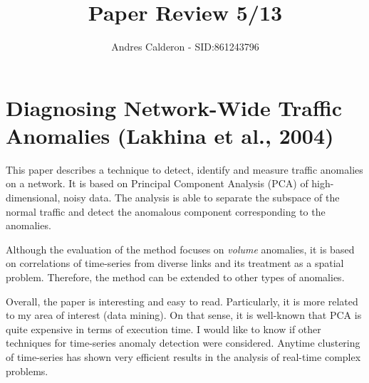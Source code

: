 \documentclass[a4paper,10pt]{scrartcl}
\title{Paper Review 5/13}
\author{Andres Calderon - SID:861243796}
\begin{document}
\maketitle
\thispagestyle{empty}

\section*{Diagnosing Network-Wide Traffic Anomalies (Lakhina et al., 2004)}
This paper describes a technique to detect, identify and measure traffic anomalies on a network.  It is based on Principal Component Analysis (PCA) of high-dimensional, noisy data.  The analysis is able to separate the subspace of the normal traffic and detect the anomalous component corresponding to the anomalies.

Although the evaluation of the method focuses on \textit{volume} anomalies, it is based on correlations of time-series from diverse links and its treatment as a spatial problem.  Therefore, the method can be extended to other types of anomalies.

Overall, the paper is interesting and easy to read.  Particularly, it is more related to my area of interest (data mining). On that sense, it is well-known that PCA is quite expensive in terms of execution time.  I would like to know if other techniques for time-series anomaly detection were considered.  Anytime clustering of time-series has shown very efficient results in the analysis of real-time complex problems.
\end{document}

